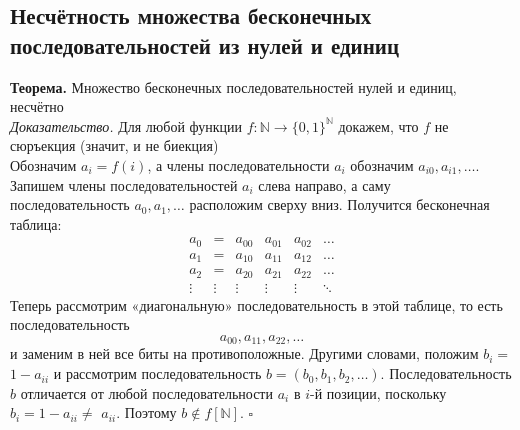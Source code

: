 \documentclass[a4paper]{article}
\newcommand{\qed}{\hfill$\square$}
\begin{document}
\subsection{Несчётность множества бесконечных последовательностей из нулей и единиц}
\textbf{Теорема.} Множество бесконечных последовательностей нулей и единиц, несчётно\\[2mm]
\textit{Доказательство.} Для любой функции $f: \mathbb{N} \rightarrow\{0,1\}^{\mathbb{N}}$ докажем, что $f$ не сюръекция (значит, и не биекция)\\[2mm]
\label{sec:2.33}\indent Обозначим $a_{i}=f(i)$, а члены последовательности $a_{i}$ обозначим $a_{i 0}, a_{i 1}, \ldots$. Запишем члены последовательностей $a_{i}$ слева направо, а саму последовательность $a_{0}, a_{1}, \ldots$ расположим сверху вниз. Получится бесконечная таблица:
$$
\begin{array}{cccccc}
a_{0} & = & a_{00} & a_{01} & a_{02} & \ldots \\
a_{1} & = & a_{10} & a_{11} & a_{12} & \ldots \\
a_{2} & = & a_{20} & a_{21} & a_{22} & \ldots \\
\vdots & \vdots & \vdots & \vdots & \vdots & \ddots
\end{array}
$$
\indent Теперь рассмотрим «диагональную» последовательность в этой таблице, то есть последовательность
$$
a_{00}, a_{11}, a_{22}, \ldots
$$
и заменим в ней все биты на противоположные. Другими словами, положим $b_{i}=$ $1-a_{i i}$ и рассмотрим последовательность $b=\left(b_{0}, b_{1}, b_{2}, \ldots\right)$. Последовательность $b$
отличается от любой последовательности $a_{i}$ в $i$-й позиции, поскольку $b_{i}=1-a_{i i} \neq$ $a_{i i}$. Поэтому $b \notin f[\mathbb{N}]$. \qed
\end{document}
